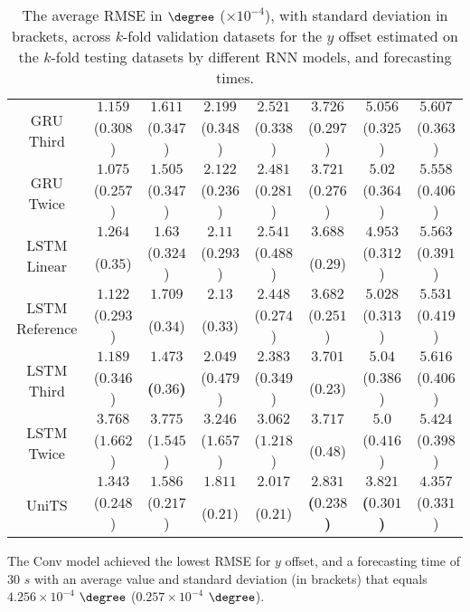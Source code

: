\begin{table}[!ht]
{\begin{tabular}{|c|c|c|c|c|c|c|c|}
			\multirow{2}{*}{GRU Third} & $1.159$ & $1.611$ & $2.199$ & $2.521$ & $3.726$ & $5.056$ & $5.607$ \\
			 & ($0.308$) & ($0.347$) & ($0.348$) & ($0.338$) & ($0.297$) & ($0.325$) & ($0.363$) \\ \hline
			\multirow{2}{*}{GRU Twice} & $1.075$ & $1.505$ & $2.122$ & $2.481$ & $3.721$ & $5.02$ & $5.558$ \\
			 & ($0.257$) & ($0.347$) & ($0.236$) & ($0.281$) & ($0.276$) & ($0.364$) & ($0.406$) \\ \hline
			\multirow{2}{*}{LSTM Linear} & $1.264$ & $1.63$ & $2.11$ & $2.541$ & $3.688$ & $4.953$ & $5.563$ \\
			 & ($0.35$) & ($0.324$) & ($0.293$) & ($0.488$) & ($0.29$) & ($0.312$) & ($0.391$) \\ \hline
			\multirow{2}{*}{LSTM Reference} & $1.122$ & $1.709$ & $2.13$ & $2.448$ & $3.682$ & $5.028$ & $5.531$ \\
			 & ($0.293$) & ($0.34$) & ($0.33$) & ($0.274$) & ($0.251$) & ($0.313$) & ($0.419$) \\ \hline
			\multirow{2}{*}{LSTM Third} & $1.189$ & $\mathbf{1.473}$ & $2.049$ & $2.383$ & $3.701$ & $5.04$ & $5.616$ \\
			 & ($0.346$) & \textbf{(}$\mathbf{0.36}$\textbf{)} & ($0.479$) & ($0.349$) & ($0.23$) & ($0.386$) & ($0.406$) \\ \hline
			\multirow{2}{*}{LSTM Twice} & $3.768$ & $3.775$ & $3.246$ & $3.062$ & $3.717$ & $5.0$ & $5.424$ \\
			 & ($1.662$) & ($1.545$) & ($1.657$) & ($1.218$) & ($0.48$) & ($0.416$) & ($0.398$) \\ \hline
			\multirow{2}{*}{UniTS} & $1.343$ & $1.586$ & $1.811$ & $2.017$ & $\mathbf{2.831}$ & $\mathbf{3.821}$ & $4.357$ \\
			 & ($0.248$) & ($0.217$) & ($0.21$) & ($0.21$) & \textbf{(}$\mathbf{0.238}$\textbf{)} & \textbf{(}$\mathbf{0.301}$\textbf{)} & ($0.331$) \\ \hline
		\end{tabular}
	}
	\caption{The average RMSE in $\degree$ ($\times 10^{-4}$), with standard deviation in brackets, across $k$-fold validation datasets for the $y$ offset estimated on the $k$-fold testing datasets by different RNN models, and forecasting times.}
	\label{tab:wilcoxon_latitude_no_abs_RMSE}
\end{table}

The Conv model achieved the lowest RMSE for $y$ offset, and a forecasting time of $30$ $s$ with an average value and standard deviation (in brackets) that equals $4.256 \times 10^{-4}$ $\degree$ ($0.257 \times 10^{-4}$ $\degree$).

